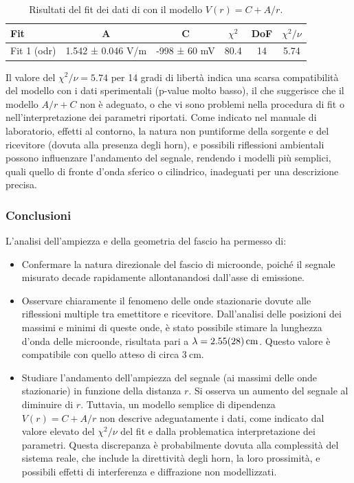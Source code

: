 \documentclass[a4paper]{article}
\begin{document}
\begin{table}[htbp]
\centering
\begin{tabular}{|l|ccccc|}
\hline
Fit & A & C & $\chi^2$ & DoF & $\chi^2/\nu$ \\\hline\hline
Fit 1 (odr) & 1.542 ± 0.046 V/m & -998 ± 60 mV & 80.4 & 14 & 5.74 \\\hline
\end{tabular}
\caption{Risultati del fit dei dati di  con il modello $V(r) = C + A/r$.}
\label{tab:risultati_fit_ampgeom_1_su_r}
\end{table}

Il valore del $\chi^2/\nu = \num{5.74}$ per 14 gradi di libertà indica una scarsa compatibilità del modello con i dati sperimentali (p-value molto basso), il che suggerisce che il modello $A/r + C$ non è adeguato, o che vi sono problemi nella procedura di fit o nell'interpretazione dei parametri riportati.
Come indicato nel manuale di laboratorio, effetti al contorno, la natura non puntiforme della sorgente e del ricevitore (dovuta alla presenza degli horn), e possibili riflessioni ambientali possono influenzare l'andamento del segnale, rendendo i modelli più semplici, quali quello di fronte d'onda sferico o cilindrico, inadeguati per una descrizione precisa.

\subsubsection{Conclusioni}
L'analisi dell'ampiezza e della geometria del fascio ha permesso di:
\begin{itemize}
    \item Confermare la natura direzionale del fascio di microonde, poiché il segnale misurato decade rapidamente allontanandosi dall'asse di emissione.
    \item Osservare chiaramente il fenomeno delle onde stazionarie dovute alle riflessioni multiple tra emettitore e ricevitore. Dall'analisi delle posizioni dei massimi e minimi di queste onde, è stato possibile stimare la lunghezza d'onda delle microonde, risultata pari a $\lambda = \SI{2.55 \pm 0.28}{\centi\metre}$. Questo valore è compatibile con quello atteso di circa $\SI{3}{\centi\metre}$.
    \item Studiare l'andamento dell'ampiezza del segnale (ai massimi delle onde stazionarie) in funzione della distanza $r$. Si osserva un aumento del segnale al diminuire di $r$. Tuttavia, un modello semplice di dipendenza $V(r) = C+A/r$ non descrive adeguatamente i dati, come indicato dal valore elevato del $\chi^2/\nu$ del fit e dalla problematica interpretazione dei parametri. Questa discrepanza è probabilmente dovuta alla complessità del sistema reale, che include la direttività degli horn, la loro prossimità, e possibili effetti di interferenza e diffrazione non modellizzati.
\end{itemize}
\end{document}

